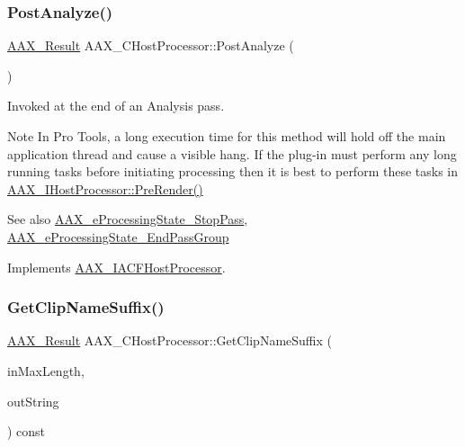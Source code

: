 \subsubsection{\texorpdfstring{PostAnalyze()}{PostAnalyze()}}
{\footnotesize\ttfamily \mbox{\hyperlink{a00392_a4d8f69a697df7f70c3a8e9b8ee130d2f}{A\+A\+X\+\_\+\+Result}} A\+A\+X\+\_\+\+C\+Host\+Processor\+::\+Post\+Analyze (\begin{DoxyParamCaption}{ }\end{DoxyParamCaption})\hspace{0.3cm}{\ttfamily [virtual]}}



Invoked at the end of an Analysis pass. 

\begin{DoxyNote}{Note}
In Pro Tools, a long execution time for this method will hold off the main application thread and cause a visible hang. If the plug-\/in must perform any long running tasks before initiating processing then it is best to perform these tasks in \mbox{\hyperlink{a01693_aac48c69e51b81cc59c7b6807c1c7f9ed}{A\+A\+X\+\_\+\+I\+Host\+Processor\+::\+Pre\+Render()}}
\end{DoxyNote}
\begin{DoxySeeAlso}{See also}
\mbox{\hyperlink{a00491_a6ec854be40c8cf810dec97de3e56c0a7a07e96f54fb45a47b56e76091f0f44cbf}{A\+A\+X\+\_\+e\+Processing\+State\+\_\+\+Stop\+Pass}}, \mbox{\hyperlink{a00491_a6ec854be40c8cf810dec97de3e56c0a7a6c7dcf22600f9fe8a6113dbd5ffd1605}{A\+A\+X\+\_\+e\+Processing\+State\+\_\+\+End\+Pass\+Group}} 
\end{DoxySeeAlso}


Implements \mbox{\hyperlink{a01693_a3b42c24c578987ab8dc6127ccc7d15b3}{A\+A\+X\+\_\+\+I\+A\+C\+F\+Host\+Processor}}.

\mbox{\label{a01485_a860f8ccf1035fff24513c20c206fc2c5}} 
\subsubsection{\texorpdfstring{GetClipNameSuffix()}{GetClipNameSuffix()}}
{\footnotesize\ttfamily \mbox{\hyperlink{a00392_a4d8f69a697df7f70c3a8e9b8ee130d2f}{A\+A\+X\+\_\+\+Result}} A\+A\+X\+\_\+\+C\+Host\+Processor\+::\+Get\+Clip\+Name\+Suffix (\begin{DoxyParamCaption}\item[{int32\+\_\+t}]{in\+Max\+Length,  }\item[{\mbox{\hyperlink{a01873}{A\+A\+X\+\_\+\+I\+String}} $\ast$}]{out\+String }\end{DoxyParamCaption}) const\hspace{0.3cm}{\ttfamily [virtual]}}



